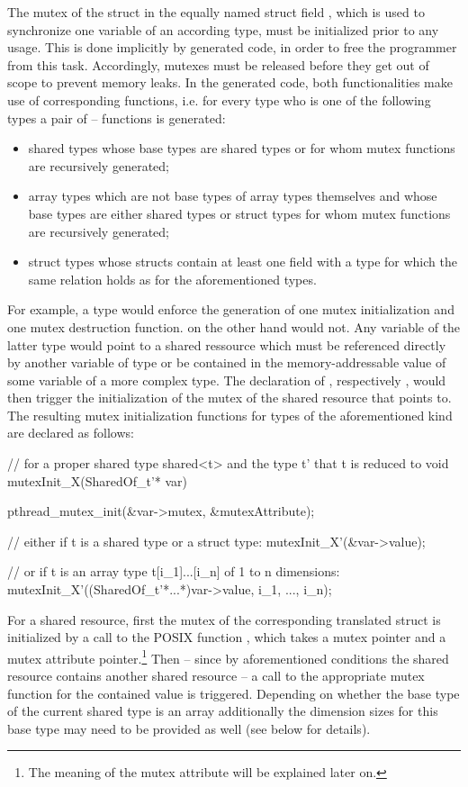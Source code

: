 The mutex of the struct  in the equally named struct field , which is used to synchronize one variable of an according type, must be initialized prior to any usage. This is done implicitly by generated code, in order to free the programmer from this task. Accordingly, mutexes must be released before they get out of scope to prevent memory leaks. In the generated code, both functionalities make use of corresponding functions, i.e. for every type who is one of the following types a pair of -- functions is generated:

\begin{itemize}
\item shared types whose base types are shared types or for whom mutex functions are recursively generated;
\item array types which are not base types of array types themselves and whose base types are either shared types or struct types for whom mutex functions are recursively generated;
\item struct types whose structs contain at least one field with a type for which the same relation holds as for the aforementioned types.
\end{itemize}

For example, a type  would enforce the generation of one mutex initialization and one mutex destruction function.  on the other hand would not. Any variable  of the latter type would point to a shared ressource which must be referenced directly by another variable  of type  or be contained in the memory-addressable value of some variable  of a more complex type. The declaration of , respectively , would then trigger the initialization of the mutex of the shared resource that  points to. The resulting mutex initialization functions for types of the aforementioned kind are declared as follows:

\begin{ccode}
// for a proper shared type shared<t> and the type t' that t is reduced to
void mutexInit_X(SharedOf_t'* var) { 
  pthread_mutex_init(&var->mutex, &mutexAttribute);
  
  // either if t is a shared type or a struct type:
  mutexInit_X'(&var->value); 
  
  // or if t is an array type t[i_1]...[i_n] of 1 to n dimensions:
  mutexInit_X'((SharedOf_t'*...*)var->value, i_1, ..., i_n); 
}
\end{ccode}
For a shared resource, first the mutex of the corresponding translated struct is initialized by a call to the POSIX function , which takes a mutex pointer and a mutex attribute pointer.\footnote{The meaning of the mutex attribute will be explained later on.} Then -- since by aforementioned conditions the shared resource contains another shared resource -- a call to the appropriate mutex function for the contained value is triggered. Depending on whether the base type of the current shared type is an array additionally the dimension sizes for this base type may need to be provided as well (see below for details).

